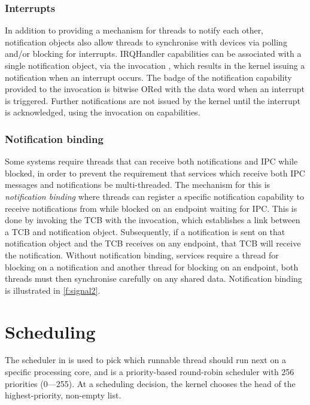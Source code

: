 \subsubsection{Interrupts}

In addition to providing a mechanism for threads to notify each other, notification objects 
also allow threads to synchronise with devices via polling and/or blocking for interrupts. 
IRQHandler capabilities can be associated with a single notification object, via the invocation
, which results in the kernel issuing a notification when an interrupt
occurs. The badge of the notification capability provided to the invocation is bitwise ORed with the
data word when an interrupt is triggered. Further notifications are not issued by the kernel
until the interrupt is acknowledged, using the  invocation on
 capabilities.

\subsubsection{Notification binding}
\label{s:notification-binding}

Some systems require threads that can receive both notifications and IPC while blocked, in order to
prevent the requirement that services which receive both IPC messages and notifications be
multi-threaded.  The mechanism for this is \emph{notification binding} where threads can register a
specific notification capability to receive notifications from while blocked on an endpoint waiting
for IPC. This is done by invoking the TCB with the \tcbbindnotification invocation, which
establishes a link between a TCB and notification object. Subsequently, if a notification is sent on
that notification object and the TCB receives on any endpoint, that TCB will receive the
notification.  Without notification binding, services require a thread for blocking on a
notification and another thread for blocking on an endpoint, both threads must then synchronise
carefully on any shared data.
Notification binding is illustrated in
\cref{f:signal2}.


\section{Scheduling}

The scheduler in \selfour is used to pick which runnable thread should run next on a specific
processing core, and is a priority-based round-robin scheduler with 256 priorities (0---255). 
At a scheduling decision, the kernel chooses the head of the highest-priority, non-empty list.

